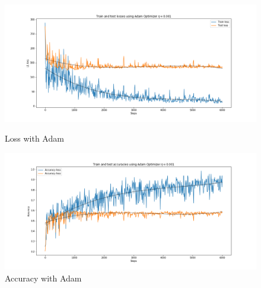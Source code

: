 \documentclass{article}
\begin{document}
 \begin{figure}[ht] 
  \begin{minipage}[b]{0.5\linewidth}
    \centering
    \includegraphics[width=1.1\linewidth]{loss_adam.png} 
    \caption{Loss with Adam} 
  \end{minipage}
  \begin{minipage}[b]{0.5\linewidth}
    \centering
    \includegraphics[width=1.1\linewidth]{acc_adam.png} 
    \caption{Accuracy with Adam}
  \end{minipage} 
\end{figure}
\end{document}
